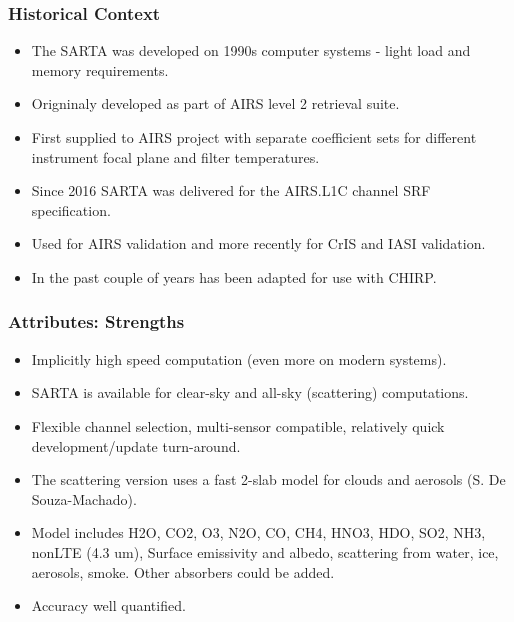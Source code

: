 \documentclass[10pt,t]{beamer}
\begin{document}
\begin{frame}
  \frametitle{Historical Context}
  \begin{itemize}
    \item The SARTA was developed on 1990s computer systems - light load and memory requirements.
    \item Origninaly developed as part of AIRS level 2 retrieval suite.
    \item First supplied to AIRS project with separate coefficient sets for different instrument focal plane and filter temperatures.
    \item Since 2016 SARTA was delivered for the AIRS.L1C channel SRF specification.
    \item Used for AIRS validation and more recently for CrIS and IASI validation.
    \item In the past couple of years has been adapted for use with CHIRP.

  \end{itemize}
\end{frame}

\begin{frame}
  \frametitle{Attributes: Strengths}
  \begin{itemize}
    \item Implicitly high speed computation (even more on modern systems).
    \item SARTA is available for clear-sky and all-sky (scattering) computations.
    \item Flexible channel selection, multi-sensor compatible, relatively quick development/update turn-around.
    \item The scattering version uses a fast 2-slab model for clouds and aerosols (S. De Souza-Machado).
    \item Model includes H2O, CO2, O3, N2O, CO, CH4, HNO3, HDO, SO2, NH3, nonLTE (4.3 um), Surface emissivity
    and albedo, scattering from water, ice, aerosols, smoke.  Other absorbers could be added.
    \item Accuracy well quantified.
  \end{itemize}
\end{frame}
\end{document}
